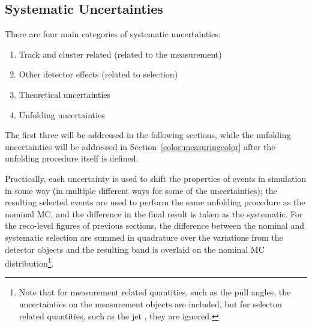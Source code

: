 


\subsection{Systematic Uncertainties}

There are four main categories of systematic uncertainties:
%
\begin{enumerate}
\item Track and cluster related (related to the measurement)
\item Other detector effects (related to selection)
\item Theoretical uncertainties
\item Unfolding uncertainties
\end{enumerate}
%
The first three will be addressed in the following sections, while the unfolding uncertainties will be addressed in Section~\ref{color:measuringcolor} after the unfolding procedure itself is defined.

 Practically, each uncertainty is used to shift the properties of events in simulation in some way (in multiple different ways for some of the uncertainties); the resulting selected events are used to perform the same unfolding procedure as the nominal MC, and the difference in the final result is taken as the systematic. For the reco-level figures of previous sections, the difference between the nominal and systematic selection are summed in quadrature over the variations from the detector objects and the resulting band is overlaid on the nominal MC distribution\footnote{Note that for measurement related quantities, such as the pull angles, the uncertainties on the measurement objects are included, but for selecton related quantities, such as the jet \pt, they are ignored.}.

